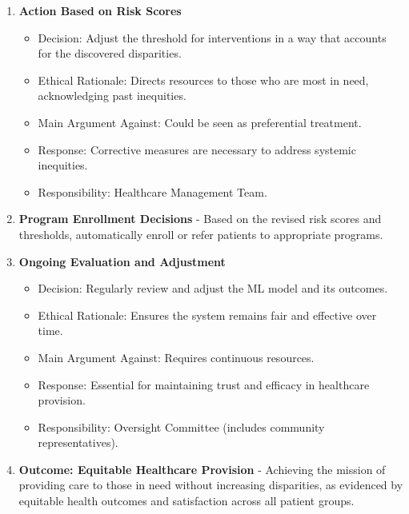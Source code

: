 \documentclass[expanded]{lkx_pset}
\begin{document}
\begin{parts}
\begin{enumerate}
		\item \textbf{Action Based on Risk Scores}
		      \begin{itemize}
			      \item Decision: Adjust the threshold for interventions in a way that accounts for the discovered disparities.
			      \item Ethical Rationale: Directs resources to those who are most in need, acknowledging past inequities.
			      \item Main Argument Against: Could be seen as preferential treatment.
			      \item Response: Corrective measures are necessary to address systemic inequities.
			      \item Responsibility: Healthcare Management Team.
		      \end{itemize}

		\item \textbf{Program Enrollment Decisions} - Based on the revised risk scores and thresholds, automatically enroll or refer patients to appropriate programs.

		\item \textbf{Ongoing Evaluation and Adjustment}
		      \begin{itemize}
			      \item Decision: Regularly review and adjust the ML model and its outcomes.
			      \item Ethical Rationale: Ensures the system remains fair and effective over time.
			      \item Main Argument Against: Requires continuous resources.
			      \item Response: Essential for maintaining trust and efficacy in healthcare provision.
			      \item Responsibility: Oversight Committee (includes community representatives).
		      \end{itemize}

		\item \textbf{Outcome: Equitable Healthcare Provision} - Achieving the mission of providing care to those in need without increasing disparities, as evidenced by equitable health outcomes and satisfaction across all patient groups.
	\end{enumerate}
\end{parts}
\end{document}
